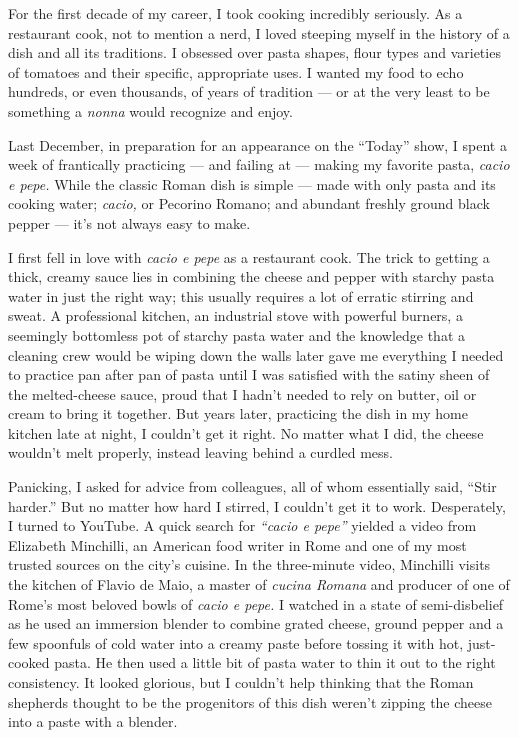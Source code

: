 For the first decade of my career, I took cooking incredibly seriously.
As a restaurant cook, not to mention a nerd, I loved steeping myself in
the history of a dish and all its traditions. I obsessed over pasta
shapes, flour types and varieties of tomatoes and their specific,
appropriate uses. I wanted my food to echo hundreds, or even thousands,
of years of tradition --- or at the very least to be something a
\emph{nonna} would recognize and enjoy.

Last December, in preparation for an appearance on the ``Today'' show, I
spent a week of frantically practicing --- and failing at --- making my
favorite pasta, \emph{cacio e pepe.} While the classic Roman dish is
simple --- made with only pasta and its cooking water; \emph{cacio,} or
Pecorino Romano; and abundant freshly ground black pepper --- it's not
always easy to make.

I first fell in love with \emph{cacio e pepe} as a restaurant cook. The
trick to getting a thick, creamy sauce lies in combining the cheese and
pepper with starchy pasta water in just the right way; this usually
requires a lot of erratic stirring and sweat. A professional kitchen, an
industrial stove with powerful burners, a seemingly bottomless pot of
starchy pasta water and the knowledge that a cleaning crew would be
wiping down the walls later gave me everything I needed to practice pan
after pan of pasta until I was satisfied with the satiny sheen of the
melted-cheese sauce, proud that I hadn't needed to rely on butter, oil
or cream to bring it together. But years later, practicing the dish in
my home kitchen late at night, I couldn't get it right. No matter what I
did, the cheese wouldn't melt properly, instead leaving behind a curdled
mess.

Panicking, I asked for advice from colleagues, all of whom essentially
said, ``Stir harder.'' But no matter how hard I stirred, I couldn't get
it to work. Desperately, I turned to YouTube. A quick search for
\emph{``cacio e pepe''} yielded a video from Elizabeth Minchilli, an
American food writer in Rome and one of my most trusted sources on the
city's cuisine. In the three-minute video, Minchilli visits the kitchen
of Flavio de Maio, a master of \emph{cucina Romana} and producer of one
of Rome's most beloved bowls of \emph{cacio e pepe.} I watched in a
state of semi-disbelief as he used an immersion blender to combine
grated cheese, ground pepper and a few spoonfuls of cold water into a
creamy paste before tossing it with hot, just-cooked pasta. He then used
a little bit of pasta water to thin it out to the right consistency. It
looked glorious, but I couldn't help thinking that the Roman shepherds
thought to be the progenitors of this dish weren't zipping the cheese
into a paste with a blender.

